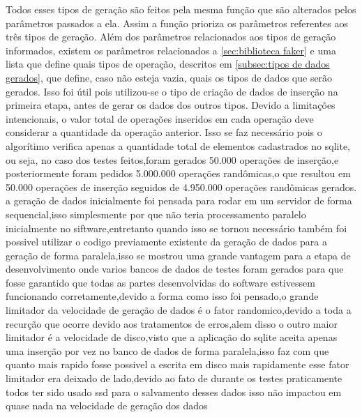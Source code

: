 \documentclass[
	12pt,				%
	openright,			%
	oneside,			%
	a4paper,			%
	english,			%
	french,				%
	spanish,			%
	brazil,				%
	]{abntex2}
\begin{document}
Todos esses tipos de geração são feitos pela mesma função que são alterados pelos parâmetros passados a ela. Assim a função prioriza os parâmetros referentes aos três tipos de geração.\newline
Além dos parâmetros relacionados aos tipos de geração informados, existem os parâmetros relacionados a \autoref{sec:biblioteca faker} e uma lista que define quais tipos de operação, descritos em \autoref{subsec:tipos de dados gerados}, que define, caso não esteja vazia, quais os tipos de dados que serão gerados. Isso foi útil pois utilizou-se o tipo de criação de dados de inserção na primeira etapa, antes de gerar os dados dos outros tipos.\newline
Devido a limitações intencionais, o valor total de operações inseridos em cada operação deve considerar a quantidade da operação anterior. Isso se faz necessário pois o algorítimo verifica apenas a quantidade total de elementos cadastrados no sqlite, ou seja, no caso dos testes feitos,foram gerados 50.000 operações de inserção,e posteriormente foram pedidos 5.000.000 operações randômicas,o que resultou em 50.000 operações de inserção seguidos de 4.950.000 operações randômicas gerados.
a geração de dados inicialmente foi pensada para rodar em um servidor de forma sequencial,isso simplesmente por que não teria processamento paralelo inicialmente no siftware,entretanto quando isso se tornou necessário também foi possivel utilizar o codigo previamente existente da geração de dados para a geração de forma paralela,isso se mostrou uma grande vantagem para a etapa de desenvolvimento onde varios bancos de dados de testes foram gerados para que fosse garantido que todas as partes desenvolvidas do software estivessem funcionando corretamente,devido a forma como isso foi pensado,o grande limitador da velocidade de geração de dados é o fator randomico,devido a toda a recurção que ocorre devido aos tratamentos de erros,alem disso o outro maior limitador é a velocidade de disco,visto que a aplicação do sqlite aceita apenas uma inserção por vez no banco de dados de forma paralela,isso faz com que quanto mais rapido fosse possivel a escrita em disco mais rapidamente esse fator limitador era deixado de lado,devido ao fato de durante os testes praticamente todos ter sido usado ssd para o salvamento desses dados isso não impactou em quase nada na velocidade de geração dos dados
\end{document}
